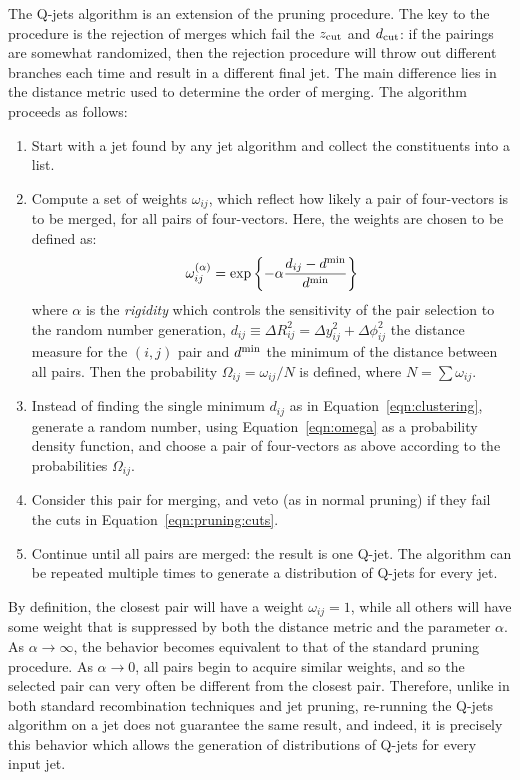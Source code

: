 The Q-jets algorithm is an extension of the pruning procedure. The key to the procedure is the rejection of merges which fail the $z_{\rm cut}$ and $d_{\rm cut}$: if the pairings are somewhat randomized, then the rejection procedure will throw out different branches each time and result in a different final jet. The main difference lies in the distance metric used to determine the order of merging. The algorithm proceeds as follows:
%
\begin{enumerate}
   \item Start with a jet found by any jet algorithm and collect the constituents into a list. 
   \item Compute a set of weights $\omega_{ij}$, which reflect how likely a pair of four-vectors is to be merged, for all pairs of four-vectors. Here, the weights are chosen to be defined as:
\begin{equation}
\omega^{(\alpha)}_{ij}=\exp{\left\{-\alpha\frac{d_{ij}-d^{\rm min}}{d^{\rm min}}\right\}}
\label{eqn:omega}
\end{equation}
%
where $\alpha$ is the \textit{rigidity} which controls the sensitivity of the pair selection to the random number generation, $d_{ij}\equiv\Delta R^2_{ij}=\Delta y^2_{ij}+\Delta \phi^2_{ij}$ the distance measure for the $(i,j)$ pair and $d^{\rm min}$ the minimum of the distance between all pairs. Then the probability $\Omega_{ij} = \omega_{ij}/N$ is defined, where $N = \sum \omega_{ij}$. 
   \item Instead of finding the single minimum $d_{ij}$ as in Equation~\ref{eqn:clustering}, generate a random number, using Equation~\ref{eqn:omega} as a probability density function, and choose a pair of four-vectors as above according to the probabilities $\Omega_{ij}$.
   \item Consider this pair for merging, and veto (as in normal pruning) if they fail the cuts in Equation~\ref{eqn:pruning:cuts}.
   \item Continue until all pairs are merged: the result is one Q-jet. The algorithm can be repeated multiple times to generate a distribution of Q-jets for every jet.
\end{enumerate}

By definition, the closest pair will have a weight $\omega_{ij} = 1$, while all others will have some weight that is suppressed by both the distance metric and the parameter $\alpha$. As $\alpha\rightarrow\infty$, %
the behavior becomes equivalent to that of the standard pruning procedure. As $\alpha\rightarrow 0$, all pairs begin to acquire similar weights, and so the selected pair can very often be different from the closest pair. Therefore, unlike in both standard recombination techniques and jet pruning, re-running the Q-jets algorithm on a jet does not guarantee the same result, and indeed, it is precisely this behavior which allows the generation of distributions of Q-jets for every input jet.%

